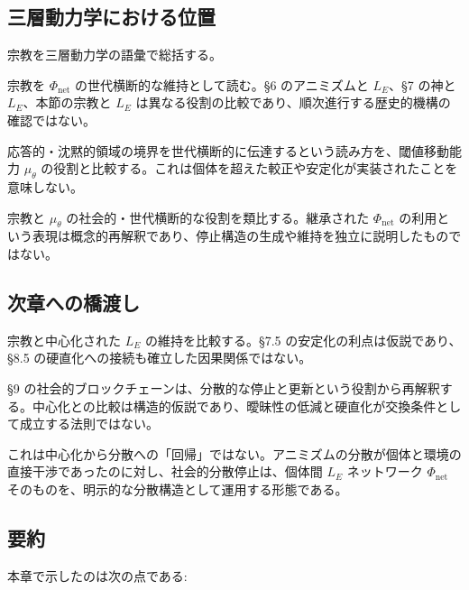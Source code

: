 \bigskip


\subsection{三層動力学における位置}


宗教を三層動力学の語彙で総括する。

宗教を $\Phi_{\text{net}}$ の世代横断的な維持として読む。\S{}6 のアニミズムと $L_E$、\S{}7 の神と $L_E$、本節の宗教と $L_E$ は異なる役割の比較であり、順次進行する歴史的機構の確認ではない。

応答的・沈黙的領域の境界を世代横断的に伝達するという読み方を、閾値移動能力 $\mu_\theta$ の役割と比較する。これは個体を超えた較正や安定化が実装されたことを意味しない。

宗教と $\mu_\theta$ の社会的・世代横断的な役割を類比する。継承された $\Phi_{\text{net}}$ の利用という表現は概念的再解釈であり、停止構造の生成や維持を独立に説明したものではない。

\bigskip


\subsection{次章への橋渡し}


宗教と中心化された $L_E$ の維持を比較する。\S{}7.5 の安定化の利点は仮説であり、\S{}8.5 の硬直化への接続も確立した因果関係ではない。

\S{}9 の社会的ブロックチェーンは、分散的な停止と更新という役割から再解釈する。中心化との比較は構造的仮説であり、曖昧性の低減と硬直化が交換条件として成立する法則ではない。

これは中心化から分散への「回帰」ではない。アニミズムの分散が個体と環境の直接干渉であったのに対し、社会的分散停止は、個体間 $L_E$ ネットワーク $\Phi_{\text{net}}$ そのものを、明示的な分散構造として運用する形態である。

\bigskip


\subsection{要約}


本章で示したのは次の点である:

